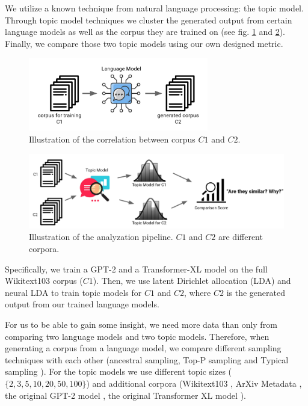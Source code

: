 We utilize a known technique from natural language processing: the topic model. Through topic model techniques we cluster the generated output from certain language models as well as the corpus they are trained on (see fig. \ref{fig:generationexample} and \ref{fig:analyzing_pipeline}).  Finally, we compare those two topic models using our own designed metric. 
\begin{figure}[H]
    \centering
    \includegraphics[width=0.7\textwidth]{figures/generationexample}
    \caption{Illustration of the correlation between corpus $C1$ and $C2$.}
    \label{fig:generationexample}
\end{figure}
\begin{figure}[H]
    \centering
    \includegraphics[width=1.0\textwidth]{figures/analyzing_pipeline}
    \caption{Illustration of the analyzation pipeline. $C1$ and $C2$ are different corpora.}
    \label{fig:analyzing_pipeline}
\end{figure}

Specifically, we train a GPT-2 \cite{gpt-2} and a Transformer-XL \cite{transformer-xl} model on the full Wikitext103 \cite{wikitext} corpus ($C1$). Then, we use latent Dirichlet allocation (LDA) \cite{blei2003latent} and neural LDA \cite{neuralLDA} to train topic models for $C1$ and $C2$, where $C2$ is the generated output from our trained language models. 

For us to be able to gain some insight, we need more data than only from comparing two language models and two topic models. Therefore, when generating a corpus from a language model, we compare different sampling techniques with each other (ancestral sampling, Top-P sampling \cite{holtzman2019curious} and Typical sampling \cite{meister2022typical}). For the topic models we use different topic sizes ($\{2, 3, 5, 10, 20, 50, 100\}$) and additional corpora (Wikitext103 \cite{wikitext}, ArXiv Metadata \cite{arxiv}, the original GPT-2 model \cite{gpt2model}, the original Transformer XL model \cite{trafoxlmodel}). 

